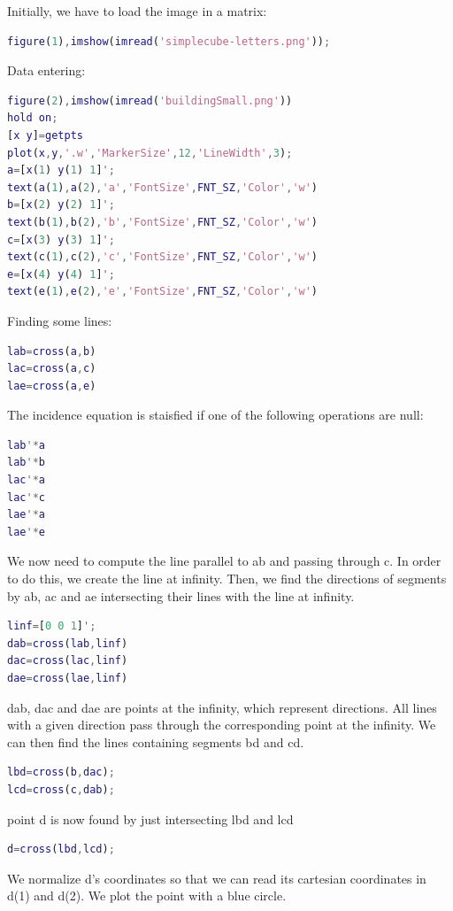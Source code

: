 \documentclass[12pt, a4paper]{report}
\newtheorem[style=M,bodystyle=\normalfont]{theorem}{Theorem}
\newtheorem[style=M,bodystyle=\normalfont]{corollary}{Corollary}
\newtheorem[style=M,bodystyle=\normalfont]{lemma}{Lemma}
\newtheorem[style=M,bodystyle=\normalfont]{definition}{Definition}
\begin{document}
    \begin{Answer}[ref=2]
        Initially, we have to load the image in a matrix: 
        \begin{lstlisting}[language=Matlab]
figure(1),imshow(imread('simplecube-letters.png'));
        \end{lstlisting}
        Data entering: 
        \begin{lstlisting}[language=Matlab]
figure(2),imshow(imread('buildingSmall.png'))
hold on;
[x y]=getpts
plot(x,y,'.w','MarkerSize',12,'LineWidth',3);
a=[x(1) y(1) 1]';
text(a(1),a(2),'a','FontSize',FNT_SZ,'Color','w')
b=[x(2) y(2) 1]';
text(b(1),b(2),'b','FontSize',FNT_SZ,'Color','w')
c=[x(3) y(3) 1]';
text(c(1),c(2),'c','FontSize',FNT_SZ,'Color','w')
e=[x(4) y(4) 1]';
text(e(1),e(2),'e','FontSize',FNT_SZ,'Color','w')
        \end{lstlisting}
        Finding some lines: 
        \begin{lstlisting}[language=Matlab]
lab=cross(a,b)
lac=cross(a,c)
lae=cross(a,e)
        \end{lstlisting}
        The incidence equation is staisfied if one of the following operations are null: 
        \begin{lstlisting}[language=Matlab]
lab'*a
lab'*b
lac'*a
lac'*c
lae'*a
lae'*e
        \end{lstlisting}  
        We now need to compute the line parallel to ab and passing through c. In order to do this, we create the line at infinity. 
        Then, we find the directions of segments by ab, ac and ae intersecting their lines with the line at infinity. 
        \begin{lstlisting}[language=Matlab]
linf=[0 0 1]';
dab=cross(lab,linf)
dac=cross(lac,linf)
dae=cross(lae,linf)
        \end{lstlisting}
        dab, dac and dae are points at the infinity, which represent directions. All lines with a given direction pass through the corresponding point at the infinity. 
        We can then find the lines containing segments bd and cd.
        \begin{lstlisting}[language=Matlab]
lbd=cross(b,dac);
lcd=cross(c,dab);
        \end{lstlisting}
        point d is now found by just intersecting lbd and lcd
        \begin{lstlisting}[language=Matlab]
d=cross(lbd,lcd);
        \end{lstlisting}
        We normalize d's coordinates so that we can read its cartesian coordinates in d(1) and d(2). We plot the point with a blue circle.

\end{Answer}
\end{document}
